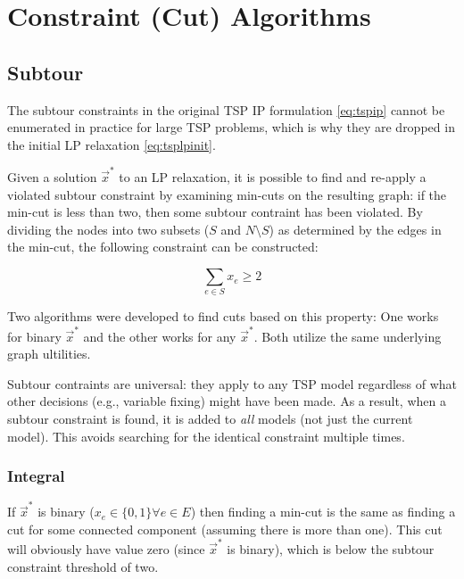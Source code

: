 \documentclass{article}
\begin{document}
\section{Constraint (Cut) Algorithms} \label{sec:constralgs}
\begin{flushleft}

\subsection{Subtour}
\begin{flushleft}

The subtour constraints
in the original TSP IP formulation \eqref{eq:tspip}
cannot be enumerated in practice
for large TSP problems,
which is why they are dropped
in the initial LP relaxation \eqref{eq:tsplpinit}.

Given a solution $\vec{x}^*$
to an LP relaxation,
it is possible to find and re-apply
a violated subtour constraint
by examining min-cuts
on the resulting graph:
if the min-cut is less than two,
then some subtour contraint
has been violated.
By dividing the nodes
into two subsets ($S$ and $N \setminus S$)
as determined by
the edges in the min-cut,
the following constraint
can be constructed:

\begin{equation}
\sum_{e \in S}{x_e} \geq 2
\end{equation}

Two algorithms were developed
to find cuts based on this property:
One works for binary $\vec{x}^*$
and the other works for any $\vec{x}^*$.
Both utilize the same underlying
graph ultilities.

Subtour contraints are universal:
they apply to any TSP model
regardless of what other decisions
(e.g., variable fixing)
might have been made.
As a result,
when a subtour constraint is found,
it is added to \textit{all} models
(not just the current model).
This avoids searching
for the identical constraint
multiple times.

\subsubsection{Integral}
\begin{flushleft}

If $\vec{x}^*$ is binary
($x_e \in \{0,1\} \forall e \in E$)
then finding a min-cut
is the same as finding a cut
for some connected component
(assuming there is more than one).
This cut will obviously have value zero
(since $\vec{x}^*$ is binary),
which is below the subtour
constraint threshold of two.


\end{flushleft}
\end{flushleft}
\end{flushleft}
\end{document}
